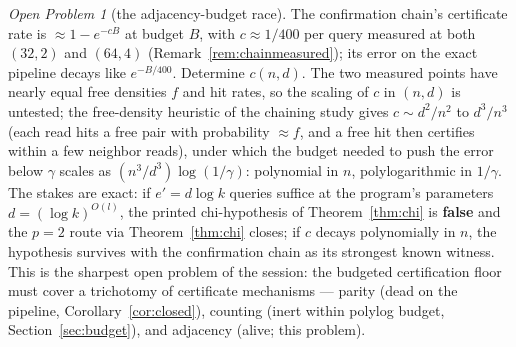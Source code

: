 \documentclass[11pt]{article}
\theoremstyle{definition}
\theoremstyle{remark}
\newtheorem{openproblem}{Open Problem}
\begin{document}
\begin{openproblem}[the adjacency-budget race]\label{op:adjacency}
The confirmation chain's certificate rate is
$\approx1-e^{-cB}$ at budget $B$, with $c\approx1/400$ per query
measured at both $(32,2)$ and $(64,4)$ (Remark~\ref{rem:chainmeasured});
its error on the exact pipeline decays like $e^{-B/400}$.  Determine
$c(n,d)$.  The two measured points have nearly equal free densities
$f$ and hit rates, so the scaling of $c$ in $(n,d)$ is untested; the
free-density heuristic of the chaining study gives
$c\sim d^2/n^2$ to $d^3/n^3$ (each read hits a free pair with
probability $\approx f$, and a free hit then certifies within a few
neighbor reads), under which the budget needed to push the error below
$\gamma$ scales as $(n^3/d^3)\log(1/\gamma)$: polynomial in $n$,
polylogarithmic in $1/\gamma$.  The stakes are exact: if
$e'=d\log k$ queries suffice at the program's parameters
$d=(\log k)^{O(l)}$, the printed chi-hypothesis of
Theorem~\ref{thm:chi} is \textbf{false} and the $p=2$ route via
Theorem~\ref{thm:chi} closes; if $c$ decays polynomially in $n$, the
hypothesis survives with the confirmation chain as its strongest known
witness.  This is the sharpest open problem of the session: the
budgeted certification floor must cover a trichotomy of certificate
mechanisms --- parity (dead on the pipeline,
Corollary~\ref{cor:closed}), counting (inert within polylog budget,
Section~\ref{sec:budget}), and adjacency (alive; this problem).
\end{openproblem}
\end{document}
